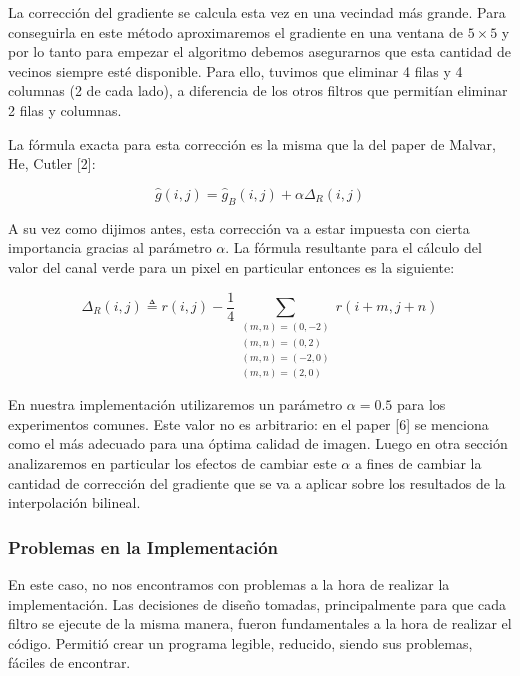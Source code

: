 La corrección del gradiente se calcula esta vez en una vecindad más grande. Para conseguirla en este método aproximaremos el gradiente en una ventana de $5 \times 5$  y por lo tanto para empezar el algoritmo debemos asegurarnos que esta cantidad de vecinos siempre esté disponible. Para ello, tuvimos que eliminar 4 filas y 4 columnas (2 de cada lado), a diferencia de los otros filtros que permitían eliminar 2 filas y columnas.

\vspace{\baselineskip}

La fórmula exacta para esta corrección es la misma que la del paper de Malvar, He, Cutler [2]: 

\[ \hat{g}(i,j) = \hat{g}_B(i,j) + \alpha\Delta_R(i,j) \]

\vspace{\baselineskip}

A su vez como dijimos antes, esta corrección va a estar impuesta con cierta importancia gracias al parámetro $\alpha$. La fórmula resultante para el cálculo del valor del canal verde para un pixel en particular entonces es la siguiente:

\[ \Delta_R(i,j) \triangleq r(i,j) - \dfrac{1}{4} \sum_{\substack{
(m,n) = (0,-2) \\
(m,n) = (0,2) \\
(m,n) = (-2,0) \\
(m,n) =  (2,0)
  }} r(i+m, j+n) \]
  
En nuestra implementación utilizaremos un parámetro $\alpha = 0.5$ para los experimentos comunes. Este valor no es arbitrario: en el paper [6] se menciona como el más adecuado para una óptima calidad de imagen. Luego en otra sección analizaremos en particular los efectos de cambiar este $\alpha$ a fines de cambiar la cantidad de corrección del gradiente que se va a aplicar sobre los resultados de la interpolación bilineal.

\subsubsection{Problemas en la Implementación}
En este caso, no nos encontramos con problemas a la hora de realizar la implementación. Las decisiones de diseño tomadas, principalmente para que cada filtro se ejecute de la misma manera, fueron fundamentales a la hora de realizar el código. Permitió crear un programa legible, reducido, siendo sus problemas, fáciles de encontrar.

\vspace{\baselineskip}

